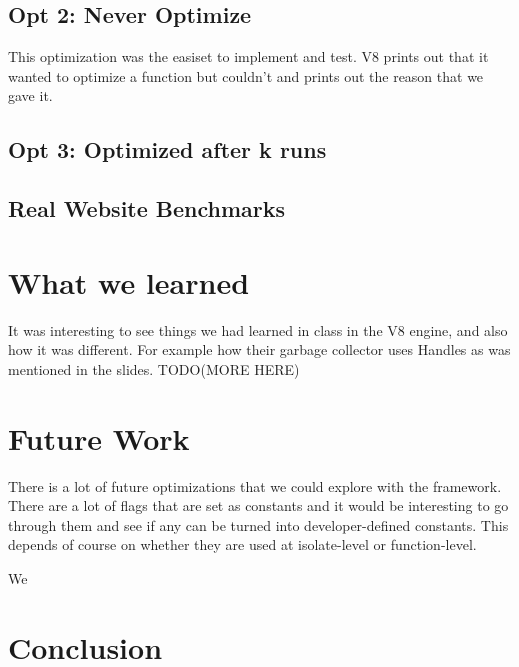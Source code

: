 \documentclass[twocolumn,showpacs,%
  nofootinbib,aps,superscriptaddress,%
  eqsecnum,prd,notitlepage,showkeys,10pt]{revtex4-1}
\begin{document}
\subsection{Opt 2: Never Optimize}
This optimization was the easiset to implement and test. V8 prints out that it wanted to optimize a function but couldn't and prints out the reason that we gave it. 

\subsection{Opt 3: Optimized after k runs}

\subsection{Real Website Benchmarks}


\section {What we learned}
It was interesting to see things we had learned in class in the V8 engine, and also how it was different. For example how their garbage collector uses Handles as was mentioned in the slides.
TODO(MORE HERE)

\section{Future Work}
There is a lot of future optimizations that we could explore with the framework. There are a lot of flags that are set as constants and it would be interesting to go through them and see if any can be turned into developer-defined constants. This depends of course on whether they are used at isolate-level or function-level. 

We 
\section{Conclusion}




\end{document}
